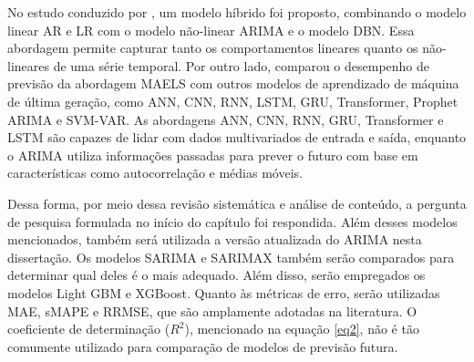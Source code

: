 No estudo conduzido por , um modelo híbrido foi proposto, combinando o modelo linear AR e LR com o modelo não-linear ARIMA e o modelo DBN. Essa abordagem permite capturar tanto os comportamentos lineares quanto os não-lineares de uma série temporal. Por outro lado,  comparou o desempenho de previsão da abordagem MAELS com outros modelos de aprendizado de máquina de última geração, como ANN, CNN, RNN, LSTM, GRU, Transformer, Prophet ARIMA e SVM-VAR. As abordagens ANN, CNN, RNN, GRU, Transformer e LSTM são capazes de lidar com dados multivariados de entrada e saída, enquanto o ARIMA utiliza informações passadas para prever o futuro com base em características como autocorrelação e médias móveis.

Dessa forma, por meio dessa revisão sistemática e análise de conteúdo, a pergunta de pesquisa formulada no início do capítulo foi respondida.
Além desses modelos mencionados, também será utilizada a versão atualizada do ARIMA nesta dissertação. Os modelos SARIMA e SARIMAX também serão comparados para determinar qual deles é o mais adequado. Além disso, serão empregados os modelos Light GBM e XGBoost. Quanto às métricas de erro, serão utilizadas MAE, sMAPE e RRMSE, que são amplamente adotadas na literatura. O coeficiente de determinação ($R^2$), mencionado na equação \eqref{eq2}, não é tão comumente utilizado para comparação de modelos de previsão futura.